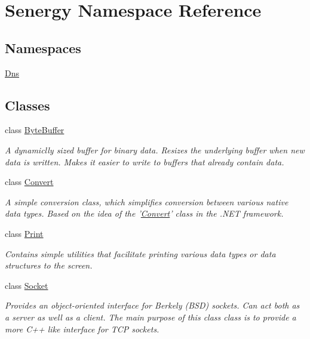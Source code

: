 \hypertarget{namespace_senergy}{\section{Senergy Namespace Reference}
\label{namespace_senergy}
}
\subsection*{Namespaces}
\begin{DoxyCompactItemize}
\item 
\hyperlink{namespace_senergy_1_1_dns}{Dns}
\end{DoxyCompactItemize}
\subsection*{Classes}
\begin{DoxyCompactItemize}
\item 
class \hyperlink{class_senergy_1_1_byte_buffer}{Byte\-Buffer}
\begin{DoxyCompactList}\small\item\em A dynamiclly sized buffer for binary data. Resizes the underlying buffer when new data is written. Makes it easier to write to buffers that already contain data. \end{DoxyCompactList}\item 
class \hyperlink{class_senergy_1_1_convert}{Convert}
\begin{DoxyCompactList}\small\item\em A simple conversion class, which simplifies conversion between various native data types. Based on the idea of the '\hyperlink{class_senergy_1_1_convert}{Convert}' class in the .N\-E\-T framework. \end{DoxyCompactList}\item 
class \hyperlink{class_senergy_1_1_print}{Print}
\begin{DoxyCompactList}\small\item\em Contains simple utilities that facilitate printing various data types or data structures to the screen. \end{DoxyCompactList}\item 
class \hyperlink{class_senergy_1_1_socket}{Socket}
\begin{DoxyCompactList}\small\item\em Provides an object-\/oriented interface for Berkely (B\-S\-D) sockets. Can act both as a server as well as a client. The main purpose of this class class is to provide a more C++ like interface for T\-C\-P sockets. \end{DoxyCompactList}\end{DoxyCompactItemize}
